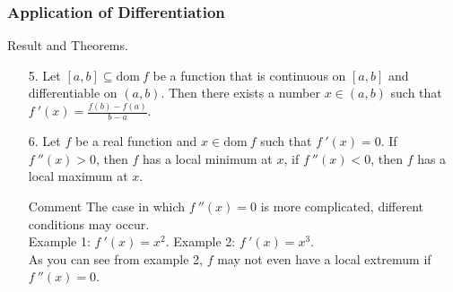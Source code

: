\documentclass{beamer}
\begin{document}
\begin{frame}
    \frametitle{Application of Differentiation}
    Result and Theorems.\\
    \begin{enumerate}
        \item[5.] Let $[a,b]\subseteq\text{dom}\ f$ be a function that is continuous on $[a,b]$ and differentiable on $(a,b)$.
            Then there exists a number $x\in(a,b)$ such that $f~'(x)=\frac{f(b)-f(a)}{b-a}$.
            \vspace{0.5em}
        \item[6.] Let $f$ be a real function and $x\in \text{dom}\ f$ such that $f~'(x)=0$. If $f~''(x)>0$, then $f$ has a local minimum at $x$,
            if $f~''(x)<0$, then $f$ has a local maximum at $x$.\\
            \vspace{0.3em}
            \begin{block}{Comment}
                The case in which $f~''(x)=0$ is more complicated, different conditions may occur.\\
                \hspace{1em}Example 1: $f~'(x)=x^2$.
                \hspace{1em}Example 2: $f~'(x)=x^3$.\\
                As you can see from example 2, $f$ may not even have a local extremum if $f~''(x)=0$.
            \end{block}

    \end{enumerate}


\end{frame}
\end{document}
